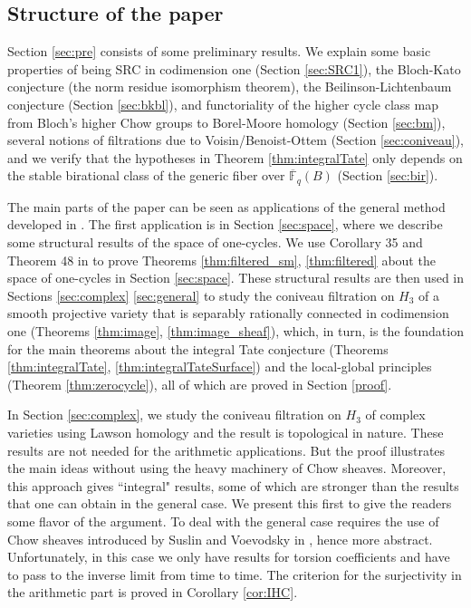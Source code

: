\documentclass{amsart}
\theoremstyle{definition}
\theoremstyle{remark}
\newcommand{\mbb}{\mathbb}
\newcommand{\FF}{\mbb{F}}
\begin{document}
\subsection{Structure of the paper}
Section \ref{sec:pre} consists of some preliminary results. 
We explain some basic properties of being SRC in codimension one (Section \ref{sec:SRC1}), the Bloch-Kato conjecture (the norm residue isomorphism theorem), the Beilinson-Lichtenbaum conjecture (Section \ref{sec:bkbl}), and functoriality of the higher cycle class map from Bloch's higher Chow groups to Borel-Moore homology (Section \ref{sec:bm}), several notions of filtrations due to Voisin/Benoist-Ottem (Section \ref{sec:coniveau}), and we verify that the hypotheses in Theorem \ref{thm:integralTate} only depends on the stable birational class of the generic fiber over $\overline{\FF}_q(B)$ (Section \ref{sec:bir}).

The main parts of the paper can be seen as applications of the general method developed in \cite{Kollar_Tian}. 
The first application is in Section \ref{sec:space}, where we describe some structural results of the space of one-cycles. We use Corollary 35 and Theorem 48 in \cite{Kollar_Tian} to prove Theorems \ref{thm:filtered_sm}, \ref{thm:filtered} about the space of one-cycles in Section \ref{sec:space}.
These structural results are then used in Sections \ref{sec:complex} \ref{sec:general} to study the coniveau filtration on $H_3$ of a smooth projective variety that is separably rationally connected in codimension one (Theorems \ref{thm:image}, \ref{thm:image_sheaf}), which, in turn, is the foundation for the main theorems about the integral Tate conjecture (Theorems \ref{thm:integralTate}, \ref{thm:integralTateSurface}) and the local-global principles (Theorem \ref{thm:zerocycle}), all of which are proved in Section \ref{proof}.


In Section \ref{sec:complex}, we study the coniveau filtration on $H_3$ of complex varieties using Lawson homology and the result is topological in nature. 
These results are not needed for the arithmetic applications.
But the proof illustrates the main ideas without using the heavy machinery of Chow sheaves.
Moreover, this approach gives ``integral" results, some of which are stronger than the results that one can obtain in the general case. 
We present this first to give the readers some flavor of the argument. 
To deal with the general case requires the use of Chow sheaves introduced by Suslin and Voevodsky in \cite{SV_Chow_Sheaves}, hence more abstract. 
Unfortunately, in this case we only have results for torsion coefficients and have to pass to the inverse limit from time to time. 
The criterion for the surjectivity in the arithmetic part is proved in Corollary \ref{cor:IHC}. 
\end{document}
